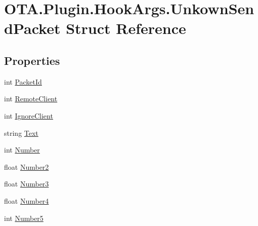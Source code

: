 \hypertarget{struct_o_t_a_1_1_plugin_1_1_hook_args_1_1_unkown_send_packet}{}\section{O\+T\+A.\+Plugin.\+Hook\+Args.\+Unkown\+Send\+Packet Struct Reference}
\label{struct_o_t_a_1_1_plugin_1_1_hook_args_1_1_unkown_send_packet}
\subsection*{Properties}
\begin{DoxyCompactItemize}
\item 
int \hyperlink{struct_o_t_a_1_1_plugin_1_1_hook_args_1_1_unkown_send_packet_adf115b5aa3acd24a2e6d72eeab047220}{Packet\+Id}
\item 
int \hyperlink{struct_o_t_a_1_1_plugin_1_1_hook_args_1_1_unkown_send_packet_a28a968662d664ae695f565c824cf07e5}{Remote\+Client}
\item 
int \hyperlink{struct_o_t_a_1_1_plugin_1_1_hook_args_1_1_unkown_send_packet_a9d9644eb0cf13009853fdc010680020c}{Ignore\+Client}
\item 
string \hyperlink{struct_o_t_a_1_1_plugin_1_1_hook_args_1_1_unkown_send_packet_a1c384008f4154148c24c1def39525bb2}{Text}
\item 
int \hyperlink{struct_o_t_a_1_1_plugin_1_1_hook_args_1_1_unkown_send_packet_aaaffe66571a5e14a00bf6911833f92e9}{Number}
\item 
float \hyperlink{struct_o_t_a_1_1_plugin_1_1_hook_args_1_1_unkown_send_packet_a3de3f7a4435b24b10b29865a370952c6}{Number2}
\item 
float \hyperlink{struct_o_t_a_1_1_plugin_1_1_hook_args_1_1_unkown_send_packet_a640392d343c7d5ae6ecc4fc61329df0b}{Number3}
\item 
float \hyperlink{struct_o_t_a_1_1_plugin_1_1_hook_args_1_1_unkown_send_packet_add8c11ad53250aee8ba0591219252f4c}{Number4}
\item 
int \hyperlink{struct_o_t_a_1_1_plugin_1_1_hook_args_1_1_unkown_send_packet_aa866d26e3a88d182c2fb03bd6c66f72c}{Number5}
\end{DoxyCompactItemize}


